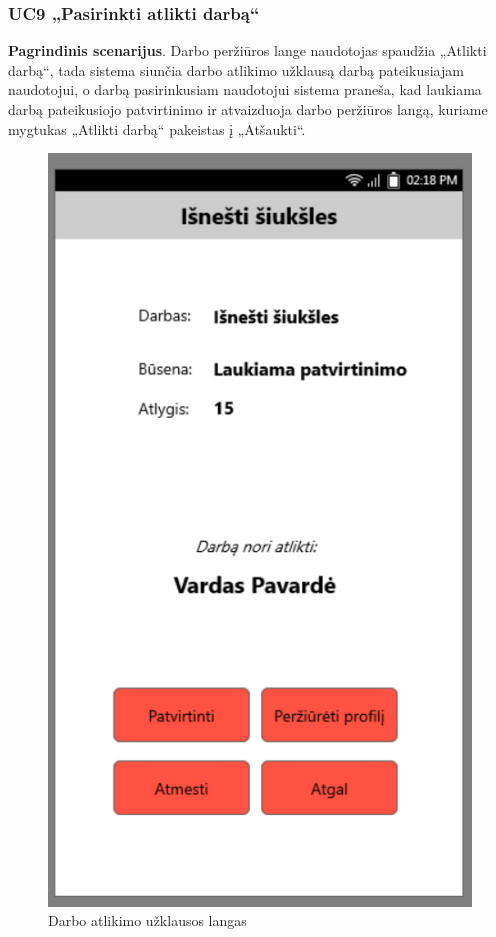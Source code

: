 \documentclass{VUMIFPSbakalaurinis}
\begin{document}
\subsubsection{UC9 „Pasirinkti atlikti darbą“}
\textbf{Pagrindinis scenarijus}. Darbo peržiūros lange naudotojas spaudžia „Atlikti darbą“, tada sistema siunčia darbo atlikimo užklausą darbą pateikusiajam naudotojui, o darbą pasirinkusiam naudotojui sistema praneša, kad laukiama darbą pateikusiojo patvirtinimo ir atvaizduoja darbo peržiūros langą, kuriame mygtukas „Atlikti darbą“ pakeistas į „Atšaukti“.

\begin{figure}[H]
	\centering
	\includegraphics[scale=0.4]{img/ScreenShots/2}
	\caption{Darbo atlikimo užklausos langas}
	\label{img:selected job 2}
\end{figure}
\end{document}
